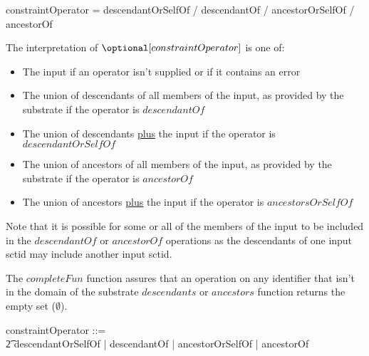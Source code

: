 \documentclass{article}
\def\bnf#1{{\scriptsize {{#1}} }}
\begin{document}
\begin{framed}
\noindent
\bnf{constraintOperator = descendantOrSelfOf / descendantOf /  ancestorOrSelfOf / ancestorOf}
\end{framed}

The interpretation of $\optional[constraintOperator]$ is one of:
\begin{itemize}[noitemsep]
\item The input if an operator isn't supplied or if it contains an error
\item The union  of descendants of all members of the input, as provided by the substrate if the operator is $descendantOf$
\item The union of descendants \underline{plus} the input if the operator is $descendantOrSelfOf$
\item The union  of ancestors of all members of the input, as provided by the substrate if the operator is $ancestorOf$ 
\item The union of ancestors \underline{plus} the input if the operator is $ancestorsOrSelfOf$
\end{itemize}

Note that it is possible for some or all of the members of the input to be included in the $descendantOf$ or $ancestorOf$ operations as
the descendants of one input sctid may include another input sctid.

The $completeFun$ function assures that an operation on any identifier that isn't in the domain of the substrate $descendants$ or $ancestors$ function 
returns the empty set ($\emptyset$).

\begin{zed}
constraintOperator ::= \\ 
\t2 descendantOrSelfOf | descendantOf | ancestorOrSelfOf | ancestorOf
\end{zed}
\end{document}
